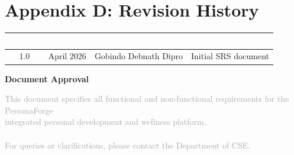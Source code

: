 \documentclass[12pt,a4paper]{article}
\begin{document}
\section{Appendix D: Revision History}

\begin{table}[h]
\centering
\begin{tabular}{|c|c|c|p{4cm}|}
\hline
\rowcolor{deepblue}
\textcolor{white}{\textbf{Version}} & \textcolor{white}{\textbf{Date}} & \textcolor{white}{\textbf{Author}} & \textcolor{white}{\textbf{Changes}} \\
\hline
\rowcolor{lightgray}
1.0 & April 2026 & Gobindo Debnath Dipro & Initial SRS document \\
\hline
\end{tabular}
\end{table}

\newpage

\begin{center}
\vspace*{3cm}
{\color{deepblue}\LARGE\textbf{Document Approval}}
\vspace{1cm}


\vspace{2cm}

{\small\textcolor{darkgray}{
  This document specifies all functional and non-functional requirements for the PersonaForge \\
  integrated personal development and wellness platform. \\~\\
  For queries or clarifications, please contact the Department of CSE.
}}

\end{center}
\end{document}
